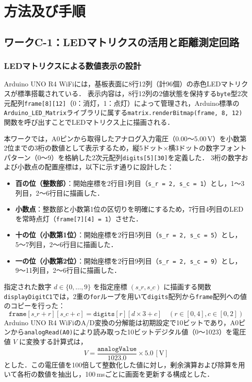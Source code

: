 \section{方法及び手順}

\subsection{ワークC-1：LEDマトリクスの活用と距離測定回路}

\subsubsection{LEDマトリクスによる数値表示の設計}
Arduino UNO R4 WiFiには，基板表面に8行12列（計96個）の赤色LEDマトリクスが標準搭載されている．
表示内容は，8行12列の2値状態を保持する\texttt{byte}型2次元配列\texttt{frame[8][12]}（0：消灯，1：点灯）によって管理され，Arduino標準の\texttt{Arduino\_LED\_Matrix}ライブラリに属する\texttt{matrix.renderBitmap(frame, 8, 12)}関数を呼び出すことでLEDマトリクス上に描画される．

本ワークでは，A0ピンから取得したアナログ入力電圧（0.00〜5.00\,V）を小数第2位までの3桁の数値として表示するため，縦5ドット×横3ドットの数字フォントパターン（0〜9）を格納した2次元配列\texttt{digits[5][30]}を定義した．
3桁の数字および小数点の配置座標は，以下に示す通りに設計した：
\begin{itemize}
    \item \textbf{百の位（整数部）}：開始座標を2行目1列目（\texttt{s\_r = 2, s\_c = 1}）とし，1〜3列目，2〜6行目に描画した．
    \item \textbf{小数点}：整数部と小数第1位の区切りを明確にするため，7行目4列目のLEDを常時点灯（\texttt{frame[7][4] = 1}）させた．
    \item \textbf{十の位（小数第1位）}：開始座標を2行目5列目（\texttt{s\_r = 2, s\_c = 5}）とし，5〜7列目，2〜6行目に描画した．
    \item \textbf{一の位（小数第2位）}：開始座標を2行目9列目（\texttt{s\_r = 2, s\_c = 9}）とし，9〜11列目，2〜6行目に描画した．
\end{itemize}

指定された数字 $d \in \{0, \dots, 9\}$ を指定座標 $(s\_r, s\_c)$ に描画する関数\texttt{displayDigitC1}では，2重の\texttt{for}ループを用いて\texttt{digits}配列から\texttt{frame}配列への値のコピーを行った：
\begin{equation}
    \texttt{frame}[s\_r + r][s\_c + c] = \texttt{digits}[r][d \times 3 + c] \quad (r \in [0, 4], c \in [0, 2])
\end{equation}
Arduino UNO R4 WiFiのA/D変換の分解能は初期設定で10ビットであり\cite{arduino_adc_resolution}，A0ピンから\texttt{analogRead(A0)}により読み取った10ビットデジタル値（0〜1023）を電圧値 $V$ に変換する計算式は，
\begin{equation}
    V = \frac{\texttt{analogValue}}{1023.0} \times 5.0\,\mathrm{[V]}
    \label{eq:adc_to_voltage}
\end{equation}
とした．この電圧値を100倍して整数化した値に対し，剰余演算および除算を用いて各桁の数値を抽出し，100\,msごとに画面を更新する構成とした．

